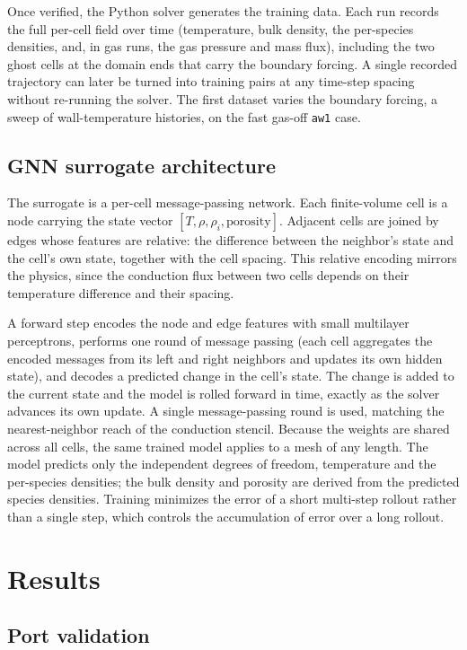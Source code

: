 \documentclass[11pt]{article}
\begin{document}
Once verified, the Python solver generates the training data. Each run records the
full per-cell field over time (temperature, bulk density, the per-species
densities, and, in gas runs, the gas pressure and mass flux), including the two
ghost cells at the domain ends that carry the boundary forcing. A single recorded
trajectory can later be turned into training pairs at any time-step spacing without
re-running the solver. The first dataset varies the boundary forcing, a sweep of
wall-temperature histories, on the fast gas-off \texttt{aw1} case.

\subsection{GNN surrogate architecture}

The surrogate is a per-cell message-passing network. Each finite-volume cell is a
node carrying the state vector $[T, \rho, \rho_i, \text{porosity}]$. Adjacent cells
are joined by edges whose features are relative: the difference between the
neighbor's state and the cell's own state, together with the cell spacing. This
relative encoding mirrors the physics, since the conduction flux between two cells
depends on their temperature difference and their spacing.

A forward step encodes the node and edge features with small multilayer
perceptrons, performs one round of message passing (each cell aggregates the
encoded messages from its left and right neighbors and updates its own hidden
state), and decodes a predicted change in the cell's state. The change is added to
the current state and the model is rolled forward in time, exactly as the solver
advances its own update. A single message-passing round is used, matching the
nearest-neighbor reach of the conduction stencil. Because the weights are shared
across all cells, the same trained model applies to a mesh of any length. The
model predicts only the independent degrees of freedom, temperature and the
per-species densities; the bulk density and porosity are derived from the
predicted species densities. Training minimizes the error of a short multi-step
rollout rather than a single step, which controls the accumulation of error over a
long rollout.

\section{Results}

\subsection{Port validation}
\label{sec:val}
\end{document}
